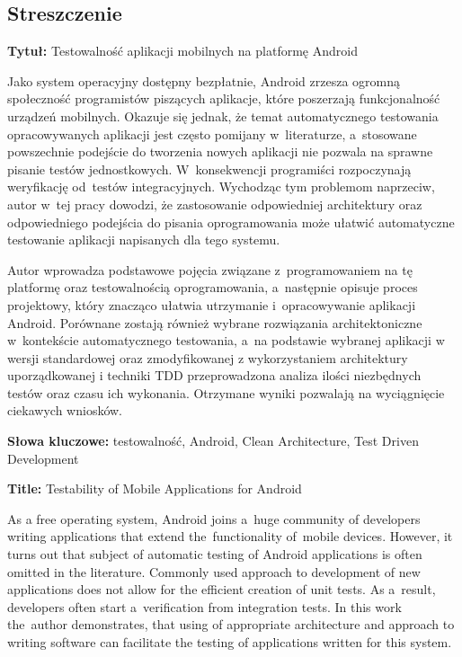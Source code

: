 \label{abstract}

\begin{center}
\section*{Streszczenie}
\end{center}

\textbf{Tytuł:} Testowalność aplikacji mobilnych na platformę Android

Jako system operacyjny dostępny bezpłatnie, Android zrzesza ogromną społeczność programistów piszących aplikacje, które poszerzają funkcjonalność urządzeń mobilnych. Okazuje się jednak, że temat automatycznego testowania opracowywanych aplikacji jest często pomijany w~literaturze, a~stosowane powszechnie podejście do tworzenia nowych aplikacji nie pozwala na sprawne pisanie testów jednostkowych. W~konsekwencji programiści rozpoczynają weryfikację od~testów integracyjnych. Wychodząc tym problemom naprzeciw, autor w~tej pracy dowodzi, że zastosowanie odpowiedniej architektury oraz odpowiedniego podejścia do pisania oprogramowania może ułatwić automatyczne testowanie aplikacji napisanych dla tego systemu.  

Autor wprowadza podstawowe pojęcia związane z~programowaniem na tę platformę oraz testowalnością oprogramowania, a~następnie opisuje proces projektowy, który znacząco ułatwia utrzymanie i~opracowywanie aplikacji Android. Porównane zostają również wybrane rozwiązania architektoniczne w~kontekście automatycznego testowania, a~na podstawie wybranej aplikacji w wersji standardowej oraz zmodyfikowanej z wykorzystaniem architektury uporządkowanej i techniki TDD przeprowadzona analiza ilości niezbędnych testów oraz czasu ich wykonania. Otrzymane wyniki pozwalają na wyciągnięcie ciekawych wniosków.

\textbf{Słowa kluczowe:} testowalność, Android, Clean Architecture, Test Driven Development

\begin{center}
\end{center}

\textbf{Title:} Testability of Mobile Applications for Android

As a free operating system, Android joins a~huge community of developers writing applications that extend the~functionality of~mobile devices. However, it turns out that subject of automatic testing of Android applications is often omitted in the literature. Commonly used approach to development of new applications does not allow for the efficient creation of unit tests. As a~result, developers often start a~verification from integration tests. In this work the~author demonstrates, that using of appropriate architecture and approach to writing software can facilitate the testing of applications written for this system.

